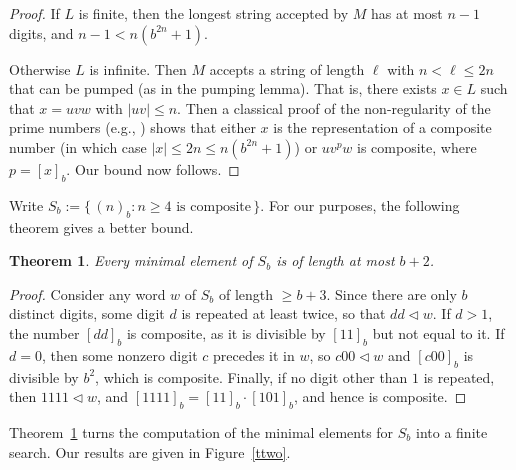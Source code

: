 \documentclass[12pt]{article}
\def\subw{\mathrel{\triangleleft}}
\theoremstyle{plain}
\newtheorem{theorem}{Theorem}
\theoremstyle{definition}
\theoremstyle{remark}
\newcommand{\0}{\mathtt{0}}
\newcommand{\1}{\mathtt{1}}
\newcommand{\2}{\mathtt{2}}
\newcommand{\3}{\mathtt{3}}
\newcommand{\4}{\mathtt{4}}
\newcommand{\5}{\mathtt{5}}
\newcommand{\6}{\mathtt{6}}
\newcommand{\7}{\mathtt{7}}
\newcommand{\8}{\mathtt{8}}
\newcommand{\9}{\mathtt{9}}
\newcommand{\set}[2]{\{\,#1{}:{}#2\,\}}
\begin{document}
\begin{proof}
If $L$ is finite, then the longest string accepted by $M$ has
at most $n-1$ digits, and $n-1 < n(b^{2n} + 1)$.

Otherwise $L$ is infinite.  Then $M$ accepts a string of length
$\ell$ with $n < \ell \leq 2n$ that can be pumped (as in the
pumping lemma).  That is, there exists $x \in L$ such that
$x = uvw$ with $|uv| \leq n$.  Then a classical proof of the
non-regularity of the prime numbers 
(e.g., \cite[Example 3.2, p.\ 57]{HU79})
shows that either $x$ is the representation of a composite 
number (in which case $|x| \leq 2n \leq n(b^{2n} + 1)$)
or $u v^p w$ is composite, where $p = [x]_b$.  
Our bound now follows.
\end{proof}

Write $S_b := \set{(n)_b}{\text{$n \geq 4$ is composite}}$.
For our purposes, the following theorem gives a better bound.

\begin{theorem}
Every minimal element of $S_b$ is of length at most $b+2$.
\label{devi}
\end{theorem}

\begin{proof}
Consider any word $w$ of $S_b$ of length $\geq b+3$.   Since there are only
$b$ distinct digits, some digit $d$ is repeated at least twice,
so that $dd \subw w$.  If $d > 1$, the number $[dd]_b$ is composite,
as it is divisible by $[11]_b$ but not equal to it.  If $d = 0$,
then some nonzero digit $c$ precedes it in $w$, so $c00 \subw w$
and $[c00]_b$ is divisible by $b^2$, which is composite.
Finally, if no digit other than $1$ is repeated, then 
$1111 \subw w$, and $[1111]_b = [11]_b \cdot [101]_b$, and hence
is composite.
\end{proof}

Theorem~\ref{devi} turns the computation of the minimal elements for
$S_b$ into a finite search.  Our results are given in Figure~\ref{ttwo}.
\end{document}
